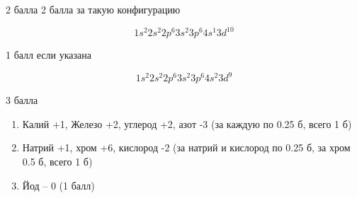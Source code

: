 \begin{solbox}{2 балла}
  2 балла за такую конфигурацию

  \[
    1s^2 2s^2 2p^6 3s^2 3p^6 4s^1 3d^{10}
  \]

  1 балл если указана

  \[
    1s^2 2s^2 2p^6 3s^2 3p^6 4s^2 3d^9
  \]
\end{solbox}



\begin{solbox}{3 балла}
  \begin{enumerate}[label=\Alph*)]
    \item Калий +1, Железо +2, углерод +2, азот -3 (за каждую по 0.25 б, всего 1 б)
    \item Натрий +1, хром +6, кислород -2 (за натрий и кислород по 0.25 б, за хром 0.5 б, всего 1 б)
    \item Йод – 0 (1 балл)
  \end{enumerate}
\end{solbox}
